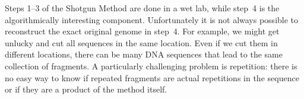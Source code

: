 \begin{remark}
Steps 1--3 of the Shotgun Method are done in a wet lab, while step~4
is the algorithmically interesting component.
%
%
Unfortunately it is not always possible to reconstruct the exact
original genome in step~4. 
%
For example, we might get unlucky and cut all sequences in the same
location.  
%
Even if we cut them in different locations, there can be many DNA
sequences that lead to the same collection of fragments. 
%
A particularly challenging problem is repetition: there is no easy way
to know if repeated fragments are actual repetitions in the sequence
or if they are a product of the method itself.
%
\end{remark}








